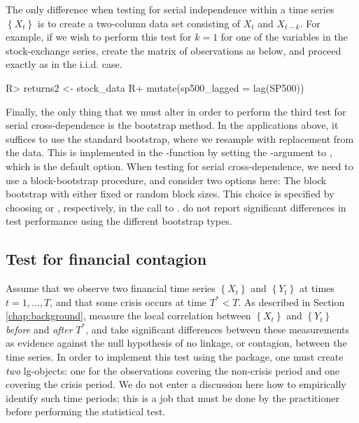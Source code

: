 The only difference when testing for serial independence within a time series \(\left\{X_t\right\}\) is to create a two-column data set consisting of
\(X_t\) and \(X_{t-k}\). For example, if we wish to perform this test for \(k=1\) for one of the variables in the stock-exchange series,
create the matrix of observations as below, and proceed exactly as in the i.i.d. case.

\begin{example}
R> returns2 <- stock_data %
R+   mutate(sp500_lagged = lag(SP500))
\end{example}

Finally, the only thing that we must alter in order to perform the third test for serial cross-dependence is the bootstrap method. In the applications above, it suffices to use the standard bootstrap, where we resample with replacement from the data. This is implemented in the -function by setting the -argument to , which is the default option. When testing for serial cross-dependence, we need to use a block-bootstrap procedure, and \citet{laca:tjos:2018} consider two options here: The block bootstrap with either fixed \citep{kuns:1989} or random \citep{poli:roma:1994} block sizes. This choice is specified by choosing  or , respectively, in the call to . \citet{laca:tjos:2018} do not report significant differences in test performance using the different bootstrap types.

\subsection{Test for financial contagion}\label{chap:cont}

Assume that we observe two financial time series \(\left\{X_t\right\}\) and \(\left\{Y_t\right\}\) at times \(t = 1,\ldots,T\), and that some crisis occurs at time \(T^* < T\). As described in Section \ref{chap:background}, \citet{stov:tjos:huft:2014} measure the local correlation between \(\left\{X_t\right\}\) and \(\left\{Y_t\right\}\) \emph{before} and \emph{after} \(T^*\), and take significant differences between these measurements as evidence against the null hypothesis of no linkage, or contagion, between the time series. In order to implement this test using the  package, one must create \emph{two} lg-objects: one for the observations covering the non-crisis period and one covering the crisis period. We do not enter a discussion here how to empirically identify such time periods; this is a job that must be done by the practitioner before performing the statistical test.

